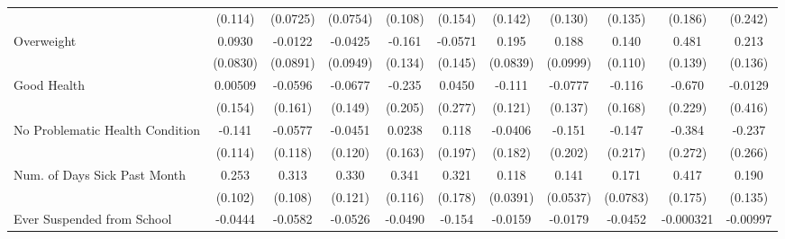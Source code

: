 {\begin{tabular}{l*{10}{c}}
            &     (0.114)         &    (0.0725)         &    (0.0754)         &     (0.108)         &     (0.154)         &     (0.142)         &     (0.130)         &     (0.135)         &     (0.186)         &     (0.242)         \\
\addlinespace
Overweight  &      0.0930         &     -0.0122         &     -0.0425         &      -0.161         &     -0.0571         &       0.195\sym{*}  &       0.188         &       0.140         &       0.481\sym{***}&       0.213         \\
            &    (0.0830)         &    (0.0891)         &    (0.0949)         &     (0.134)         &     (0.145)         &    (0.0839)         &    (0.0999)         &     (0.110)         &     (0.139)         &     (0.136)         \\
\addlinespace
Good Health &     0.00509         &     -0.0596         &     -0.0677         &      -0.235         &      0.0450         &      -0.111         &     -0.0777         &      -0.116         &      -0.670\sym{**} &     -0.0129         \\
            &     (0.154)         &     (0.161)         &     (0.149)         &     (0.205)         &     (0.277)         &     (0.121)         &     (0.137)         &     (0.168)         &     (0.229)         &     (0.416)         \\
\addlinespace
No Problematic Health Condition&      -0.141         &     -0.0577         &     -0.0451         &      0.0238         &       0.118         &     -0.0406         &      -0.151         &      -0.147         &      -0.384         &      -0.237         \\
            &     (0.114)         &     (0.118)         &     (0.120)         &     (0.163)         &     (0.197)         &     (0.182)         &     (0.202)         &     (0.217)         &     (0.272)         &     (0.266)         \\
\addlinespace
Num. of Days Sick Past Month&       0.253\sym{*}  &       0.313\sym{**} &       0.330\sym{**} &       0.341\sym{**} &       0.321         &       0.118\sym{**} &       0.141\sym{**} &       0.171\sym{*}  &       0.417\sym{*}  &       0.190         \\
            &     (0.102)         &     (0.108)         &     (0.121)         &     (0.116)         &     (0.178)         &    (0.0391)         &    (0.0537)         &    (0.0783)         &     (0.175)         &     (0.135)         \\
\addlinespace
Ever Suspended from School&     -0.0444         &     -0.0582         &     -0.0526         &     -0.0490         &      -0.154         &     -0.0159         &     -0.0179         &     -0.0452         &   -0.000321         &    -0.00997         \\

\end{tabular}}
